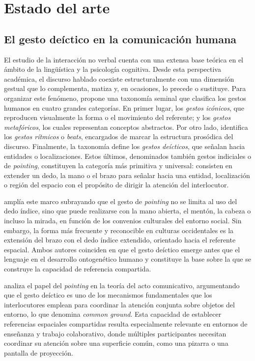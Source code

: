 \documentclass[12pt]{report} %
\begin{document}
\chapter{Estado del arte}

\section{El gesto deíctico en la comunicación humana}

El estudio de la interacción no verbal cuenta con una extensa base teórica en el ámbito de la lingüística y la psicología cognitiva. Desde esta perspectiva académica, el discurso hablado coexiste estructuralmente con una dimensión gestual que lo complementa, matiza y, en ocasiones, lo precede o sustituye. Para organizar este fenómeno, \citet{mcneill1992} propone una taxonomía seminal que clasifica los gestos humanos en cuatro grandes categorías. En primer lugar, los \textit{gestos icónicos}, que reproducen visualmente la forma o el movimiento del referente; y los \textit{gestos metafóricos}, los cuales representan conceptos abstractos. Por otro lado, identifica los \textit{gestos rítmicos} o \textit{beats}, encargados de marcar la estructura prosódica del discurso. Finalmente, la taxonomía define los \textit{gestos deícticos}, que señalan hacia entidades o localizaciones. Estos últimos, denominados también gestos indiciales o de \textit{pointing}, constituyen la categoría más primitiva y universal: consisten en extender un dedo, la mano o el brazo para señalar hacia una entidad, localización o región del espacio con el propósito de dirigir la atención del interlocutor.

\citet{kendon2004} amplía este marco subrayando que el gesto de \textit{pointing} no se limita al uso del dedo índice, sino que puede realizarse con la mano abierta, el mentón, la cabeza o incluso la mirada, en función de los convenios culturales del entorno social. Sin embargo, la forma más frecuente y reconocible en culturas occidentales es la extensión del brazo con el dedo índice extendido, orientado hacia el referente espacial. Ambos autores coinciden en que el gesto deíctico emerge antes que el lenguaje en el desarrollo ontogenético humano y constituye la base sobre la que se construye la capacidad de referencia compartida.

\citet{clark1996} analiza el papel del \textit{pointing} en la teoría del acto comunicativo, argumentando que el gesto deíctico es uno de los mecanismos fundamentales que los interlocutores emplean para coordinar la atención conjunta sobre objetos del entorno, lo que denomina \textit{common ground}. Esta capacidad de establecer referencias espaciales compartidas resulta especialmente relevante en entornos de enseñanza y trabajo colaborativo, donde múltiples participantes necesitan coordinar su atención sobre una superficie común, como una pizarra o una pantalla de proyección.
\end{document}
